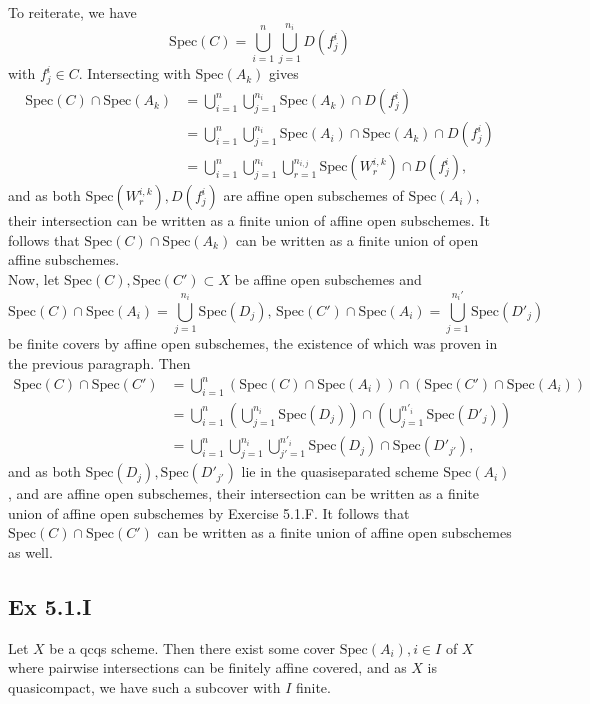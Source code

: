 \documentclass{article}
\theoremstyle{definition}
\newcommand{\Spec}{\text{Spec}}
\begin{document}
To reiterate, we have
\[
	\Spec(C)
	=
	\bigcup_{i = 1}^{n}
	\bigcup_{j = 1}^{n_i}
	D(f_j^{i})
\]
with $f_j^{i} \in C$. Intersecting with $\Spec(A_k)$ gives
\begin{align*}
	\Spec(C) \cap \Spec(A_k)
	 & =
	\bigcup_{i = 1}^{n}
	\bigcup_{j = 1}^{n_i}
	\Spec(A_k) \cap D(f_j^{i})                 \\
	 & =
	\bigcup_{i = 1}^{n}
	\bigcup_{j = 1}^{n_i}
	\Spec(A_i) \cap \Spec(A_k) \cap D(f_j^{i}) \\
	 & =
	\bigcup_{i = 1}^{n}
	\bigcup_{j = 1}^{n_i}
	\bigcup_{r = 1}^{n_{i, j}}
	\Spec(W^{i, k}_{r}) \cap D(f_j^{i}),
\end{align*}
and as both $\Spec(W^{i, k}_{r}), D(f_j^{i})$ are affine open subschemes of
$\Spec(A_i)$, their intersection can be written as a finite union of affine
open subschemes. It follows that $\Spec(C) \cap \Spec(A_k)$ can be written as a
finite union of open affine subschemes. \\


Now, let $\Spec(C), \Spec(C') \subset X$ be affine open subschemes and
\[
	\Spec(C) \cap \Spec(A_i) = \bigcup_{j = 1}^{n_i} \Spec(D_j), \,
	\Spec(C') \cap \Spec(A_i) = \bigcup_{j = 1}^{n_i'} \Spec(D'_j)
\]
be finite covers by affine open subschemes, the existence of which was proven
in the previous paragraph. Then
\begin{align*}
	\Spec(C) \cap \Spec(C')
	 & =
	\bigcup_{i = 1}^{n}
	\left(\Spec(C) \cap \Spec(A_i)\right)
	\cap
	\left(\Spec(C') \cap \Spec(A_i)\right) \\
	 & =
	\bigcup_{i = 1}^{n}
	\left(
	\bigcup_{j = 1}^{n_i} \Spec(D_j)
	\right)
	\cap
	\left(
	\bigcup_{j = 1}^{n'_i} \Spec(D'_j)
	\right)                                \\
	 & =
	\bigcup_{i = 1}^{n}
	\bigcup_{j = 1}^{n_i}
	\bigcup_{j' = 1}^{n'_i}
	\Spec(D_j)
	\cap
	\Spec(D'_{j'}),
\end{align*}
and as both $\Spec(D_j), \Spec(D'_{j'})$ lie in the quasiseparated scheme
$\Spec(A_i)$, and are affine open subschemes, their intersection can be written
as a finite union of affine open subschemes by Exercise 5.1.F. It follows that
$\Spec(C) \cap \Spec(C')$ can be written as a finite union of affine open
subschemes as well.


\subsection*{Ex 5.1.I}

Let $X$ be a qcqs scheme. Then there exist some cover $\Spec(A_i), i \in I$ of
$X$ where pairwise intersections can be finitely affine covered, and as $X$ is
quasicompact, we have such a subcover with $I$ finite. \\
\end{document}
